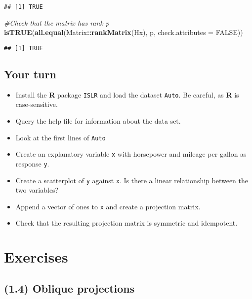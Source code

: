\documentclass[]{book}
\newenvironment{Shaded}{\begin{snugshade}}{\end{snugshade}}
\newcommand{\KeywordTok}[1]{\textcolor[rgb]{0.13,0.29,0.53}{\textbf{#1}}}
\newcommand{\DataTypeTok}[1]{\textcolor[rgb]{0.13,0.29,0.53}{#1}}
\newcommand{\CommentTok}[1]{\textcolor[rgb]{0.56,0.35,0.01}{\textit{#1}}}
\newcommand{\OtherTok}[1]{\textcolor[rgb]{0.56,0.35,0.01}{#1}}
\newcommand{\OperatorTok}[1]{\textcolor[rgb]{0.81,0.36,0.00}{\textbf{#1}}}
\newcommand{\NormalTok}[1]{#1}
\providecommand{\tightlist}{%
  \setlength{\itemsep}{0pt}\setlength{\parskip}{0pt}}
\begin{document}
\begin{verbatim}
## [1] TRUE
\end{verbatim}

\begin{Shaded}
\begin{Highlighting}[]
\CommentTok{#Check that the matrix has rank p}
\KeywordTok{isTRUE}\NormalTok{(}\KeywordTok{all.equal}\NormalTok{(Matrix}\OperatorTok{::}\KeywordTok{rankMatrix}\NormalTok{(Hx), p, }\DataTypeTok{check.attributes =} \OtherTok{FALSE}\NormalTok{))}
\end{Highlighting}
\end{Shaded}

\begin{verbatim}
## [1] TRUE
\end{verbatim}

\subsection{Your turn}\label{your-turn}

\begin{itemize}
\tightlist
\item
  Install the \textbf{R} package \texttt{ISLR} and load the dataset
  \texttt{Auto}. Be careful, as \textbf{R} is case-sensitive.
\item
  Query the help file for information about the data set.
\item
  Look at the first lines of \texttt{Auto}
\item
  Create an explanatory variable \texttt{x} with horsepower and mileage
  per gallon as response \texttt{y}.
\item
  Create a scatterplot of \texttt{y} against \texttt{x}. Is there a
  linear relationship between the two variables?
\item
  Append a vector of ones to \texttt{x} and create a projection matrix.
\item
  Check that the resulting projection matrix is symmetric and
  idempotent.
\end{itemize}

\section{Exercises}\label{exercises}

\subsection*{(1.4) Oblique projections}\label{oblique-projections}
\end{document}
